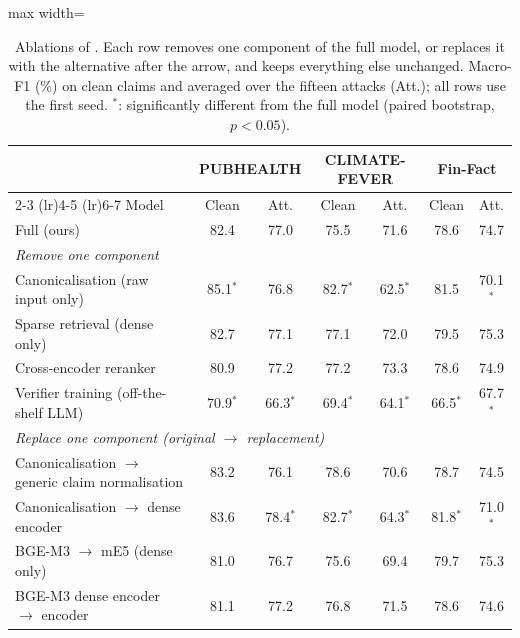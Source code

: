 \begin{table}[t]\centering\small\setlength{\tabcolsep}{5pt}
\begin{adjustbox}{max width=\textwidth}\begin{tabular}{lcccccc}
\toprule
 & \multicolumn{2}{c}{PUBHEALTH} & \multicolumn{2}{c}{CLIMATE-FEVER} & \multicolumn{2}{c}{Fin-Fact} \\
\cmidrule(lr){2-3} \cmidrule(lr){4-5} \cmidrule(lr){6-7}
Model & Clean & Att. & Clean & Att. & Clean & Att. \\
\midrule
Full \method{} (ours) & 82.4 & 77.0 & 75.5 & 71.6 & 78.6 & 74.7 \\
\midrule
\multicolumn{7}{l}{\emph{Remove one component}} \\
\quad Canonicalisation (raw input only) & 85.1$^{*}$ & 76.8 & 82.7$^{*}$ & 62.5$^{*}$ & 81.5 & 70.1$^{*}$ \\
\quad Sparse retrieval (dense only) & 82.7 & 77.1 & 77.1 & 72.0 & 79.5 & 75.3 \\
\quad Cross-encoder reranker & 80.9 & 77.2 & 77.2 & 73.3 & 78.6 & 74.9 \\
\quad Verifier training (off-the-shelf LLM) & 70.9$^{*}$ & 66.3$^{*}$ & 69.4$^{*}$ & 64.1$^{*}$ & 66.5$^{*}$ & 67.7$^{*}$ \\
\midrule
\multicolumn{7}{l}{\emph{Replace one component (original $\to$ replacement)}} \\
\quad Canonicalisation $\to$ generic claim normalisation & 83.2 & 76.1 & 78.6 & 70.6 & 78.7 & 74.5 \\
\quad Canonicalisation $\to$ \air{} dense encoder & 83.6 & 78.4$^{*}$ & 82.7$^{*}$ & 64.3$^{*}$ & 81.8$^{*}$ & 71.0$^{*}$ \\
\quad BGE-M3 $\to$ mE5 (dense only) & 81.0 & 76.7 & 75.6 & 69.4 & 79.7 & 75.3 \\
\quad BGE-M3 dense encoder $\to$ \air{} encoder & 81.1 & 77.2 & 76.8 & 71.5 & 78.6 & 74.6 \\
\bottomrule
\end{tabular}\end{adjustbox}
\caption{Ablations of \method{}. Each row removes one component of the full model, or replaces it with the alternative after the arrow, and keeps everything else unchanged. Macro-F1 (\%) on clean claims and averaged over the fifteen attacks (Att.); all rows use the first seed. $^{*}$: significantly different from the full model (paired bootstrap, $p<0.05$).}
\label{tab:ablation}
\end{table}

